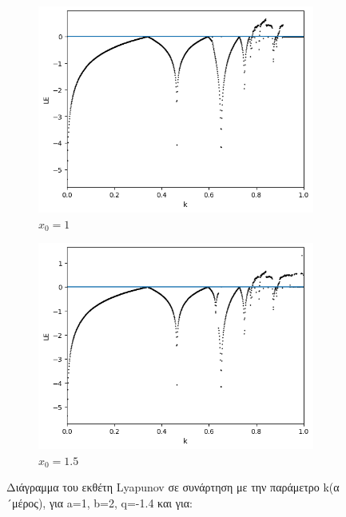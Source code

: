 \begin{figure}[h!]
\begin{subfigure}[b]{0.45\textwidth}
		\includegraphics[width=\textwidth]{LateX images/graphs q16/g9}
		\caption{\(x_0=1\)}
		\label{f:g35}
	\end{subfigure}
	\hfill
	\begin{subfigure}[b]{0.45\textwidth}
		\centering
		\includegraphics[width=\textwidth]{LateX images/graphs q16/g10}
		\caption{\(x_0=1.5\)}
		\label{f:g36}
	
	\end{subfigure}
	\hfill
	\caption{ Διάγραμμα του εκθέτη Lyapunov σε συνάρτηση με την παράμετρο k(α´μέρος), για a=1, b=2, q=-1.4 και για:}
	\label{f:g235}
\end{figure}

